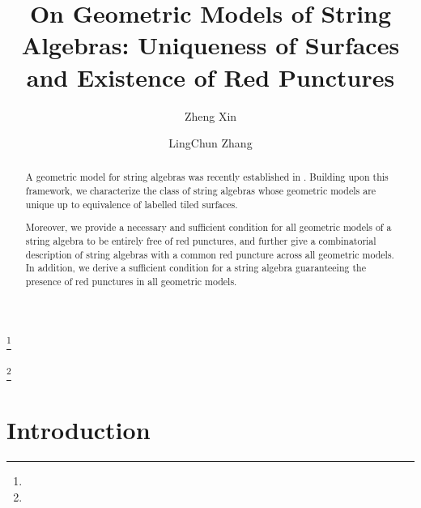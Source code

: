 \documentclass[11pt]{amsart}
\numberwithin{equation}{section}
\theoremstyle{definition}
\newcommand{\rpoint}{\color{red}{\bullet}}
\begin{document}
\title[On Geometric Models of String Algebras]{On Geometric Models of String Algebras: Uniqueness of Surfaces and Existence of Red Punctures}

\author[Zheng Xin]{Zheng Xin}
\address{Zheng Xin,
	School of Mathematics and Statistics, Shaanxi Normal University, Xi'an 710062, China}

\author[LingChun Zhang]{LingChun Zhang}
\address{LingChun Zhang,
	School of Mathematics and Statistics, Shaanxi Normal University, Xi'an 710062, China}

\thanks{%
}



\thanks{}

%


\begin{abstract}
A geometric model for string algebras was recently established in \cite{BC24}. Building upon this framework, we characterize the class of string algebras whose geometric models are unique up to equivalence of labelled tiled surfaces. 

Moreover, we provide a necessary and sufficient condition for all geometric models of a string algebra to be entirely free of red punctures, and further give a combinatorial description of string algebras with a common red puncture across all geometric models. In addition, we derive a sufficient condition for a string algebra guaranteeing the presence of red punctures in all geometric models.
\end{abstract}


\maketitle
\setcounter{tocdepth}{2} %

\tableofcontents

\section*{Introduction}\label{Introductions}
\end{document}

